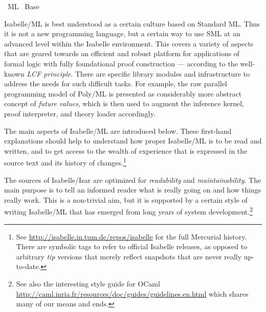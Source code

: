 %
\begin{isabellebody}%
\def\isabellecontext{ML}%
%
\isadelimtheory
%
\endisadelimtheory
%
\isatagtheory
{}\isamarkupfalse%
\ {\isachardoublequoteopen}ML{\isachardoublequoteclose}\isanewline
{}\ Base\isanewline
{}%
\endisatagtheory
{\isafoldtheory}%
%
\isadelimtheory
%
\endisadelimtheory
%
\isamarkuptrue%
%
\begin{isamarkuptext}%
Isabelle/ML is best understood as a certain culture based on
  Standard ML.  Thus it is not a new programming language, but a
  certain way to use SML at an advanced level within the Isabelle
  environment.  This covers a variety of aspects that are geared
  towards an efficient and robust platform for applications of formal
  logic with fully foundational proof construction --- according to
  the well-known \emph{LCF principle}.  There are specific library
  modules and infrastructure to address the needs for such difficult
  tasks.  For example, the raw parallel programming model of Poly/ML
  is presented as considerably more abstract concept of \emph{future
  values}, which is then used to augment the inference kernel, proof
  interpreter, and theory loader accordingly.

  The main aspects of Isabelle/ML are introduced below.  These
  first-hand explanations should help to understand how proper
  Isabelle/ML is to be read and written, and to get access to the
  wealth of experience that is expressed in the source text and its
  history of changes.\footnote{See
  \url{http://isabelle.in.tum.de/repos/isabelle} for the full
  Mercurial history.  There are symbolic tags to refer to official
  Isabelle releases, as opposed to arbitrary \emph{tip} versions that
  merely reflect snapshots that are never really up-to-date.}%
\end{isamarkuptext}%
\isamarkuptrue%
%
\isamarkuptrue%
%
\begin{isamarkuptext}%
The sources of Isabelle/Isar are optimized for
  \emph{readability} and \emph{maintainability}.  The main purpose is
  to tell an informed reader what is really going on and how things
  really work.  This is a non-trivial aim, but it is supported by a
  certain style of writing Isabelle/ML that has emerged from long
  years of system development.\footnote{See also the interesting style
  guide for OCaml
  \url{http://caml.inria.fr/resources/doc/guides/guidelines.en.html}
  which shares many of our means and ends.}


\end{isamarkuptext}
\end{isabellebody}
